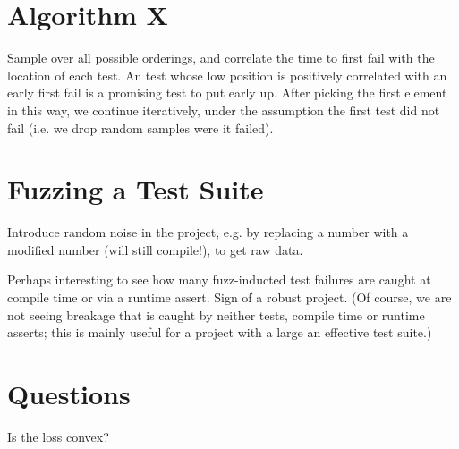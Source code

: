 \documentclass[12pt]{article}
\begin{document}
\section{Algorithm X}

Sample over all possible orderings, and correlate the time to first fail with the location of each test. An test whose low position is positively correlated with an early first fail is a promising test to put early up. After picking the first element in this way, we continue iteratively, under the assumption the first test did not fail (i.e. we drop random samples were it failed).

\section{Fuzzing a Test Suite}

Introduce random noise in the project, e.g. by replacing a number with a modified number (will still compile!), to get raw data.

Perhaps interesting to see how many fuzz-inducted test failures are caught at compile time or via a runtime assert. Sign of a robust project. (Of course, we are not seeing breakage that is caught by neither tests, compile time or runtime asserts; this is mainly useful for a project with a large an effective test suite.)

\section{Questions}

Is the loss convex?

%
%
\end{document}
